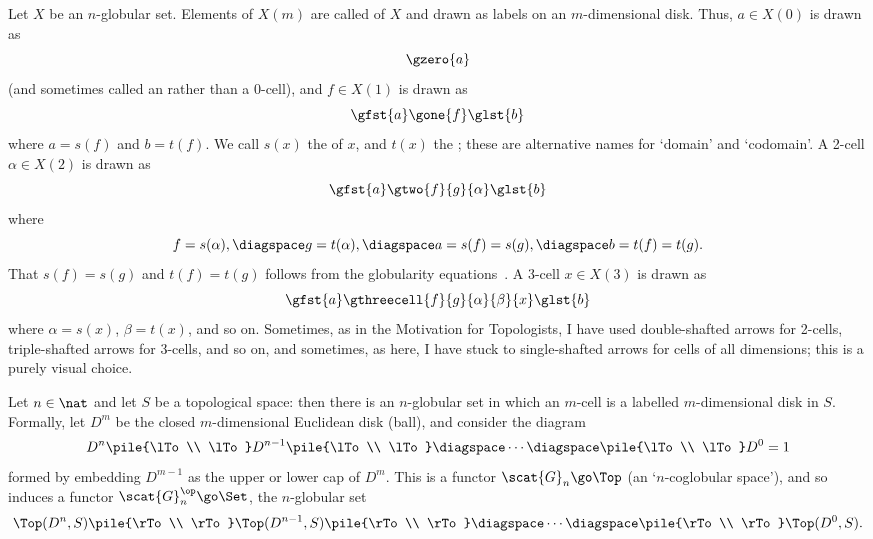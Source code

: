 Let $X$ be an $n$-globular set.  Elements of $X(m)$ are called
%
%
%
of $X$ and drawn as labels on an $m$-dimensional disk.
Thus, $a \in X(0)$ is drawn as
\[
\gzero{a}
\]
(and sometimes called an %
%
%
rather than a 0-cell), and $f \in
X(1)$ is drawn as
\[
\gfst{a} \gone{f} \glst{b}
\]
where $a = s(f)$ and $b = t(f)$.  We call $s(x)$ the %
%
%
of $x$,
and $t(x)$ the ;%
%
%
these are alternative names for `domain' and
`codomain'.  A 2-cell $\alpha \in X(2)$ is drawn as
\[
\gfst{a} \gtwo{f}{g}{\alpha} \glst{b}
\]
where
\[
f = s(\alpha),
\diagspace
g = t(\alpha),
\diagspace
a = s(f) = s(g),
\diagspace
b = t(f) = t(g).
\]
That $s(f) = s(g)$ and $t(f) = t(g)$ follows from the globularity
equations~.  A 3-cell $x \in X(3)$ is drawn as
\[
\gfst{a} \gthreecell{f}{g}{\alpha}{\beta}{x} \glst{b}
\]
where $\alpha = s(x)$, $\beta = t(x)$, and so on.  Sometimes, as in the
Motivation for Topologists, I have used double-shafted arrows%
%
%
for 2-cells,
triple-shafted arrows for 3-cells, and so on, and sometimes, as here, I
have stuck to single-shafted arrows for cells of all dimensions; this is
a purely visual choice.

\begin{example}	
Let $n\in\nat$ and let $S$ be a topological space: then there is an
$n$-globular%
%
%
%
%
%
set in which an $m$-cell is a labelled $m$-dimensional disk in
$S$.  Formally, let $D^m$%
% 
%
be the closed $m$-dimensional Euclidean disk%
%
%
(ball), and consider the diagram
\[
D^n
\pile{\lTo\\ \lTo}
D^{n-1}
\pile{\lTo\\ \lTo}
\diagspace
\cdots 
\diagspace 
\pile{\lTo\\ \lTo}
D^0 = 1
\]
formed by embedding $D^{m-1}$ as the upper or lower cap of $D^m$.  This is
a functor $\scat{G}_n \go \Top$ (an `$n$-coglobular space'), and so induces
a functor $\scat{G}_n^\op \go \Set$, the $n$-globular set
\[
\Top(D^n, S)
\pile{\rTo\\ \rTo}
\Top(D^{n-1}, S)
\pile{\rTo\\ \rTo}
\diagspace
\cdots 
\diagspace 
\pile{\rTo\\ \rTo}
\Top(D^0, S).
\]
\end{example}

